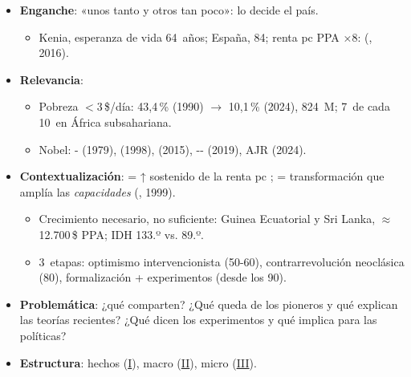 \documentclass{article}
\begin{document}
\cabecerarepaso
\begin{columnas}

\begin{itemize}
\item \textbf{Enganche}: «unos tanto y otros tan poco»: lo decide el país.
  \begin{itemize}
  \item Kenia, esperanza de vida 64~años; España, 84; renta pc PPA ×8:  (, 2016).
  \end{itemize}
\item \textbf{Relevancia}:
  \begin{itemize}
  \item Pobreza $<$3\,\$/día: 43,4\,\% (1990) $\to$ 10,1\,\% (2024), 824~M; 7~de cada 10~en África subsahariana.
  \item Nobel: - (1979),  (1998),  (2015), -- (2019), AJR (2024).
  \end{itemize}
\item \textbf{Contextualización}:  = ↑ sostenido de la renta pc ;  = transformación que amplía las \emph{capacidades} (, 1999).
  \begin{itemize}
  \item Crecimiento necesario, no suficiente: Guinea Ecuatorial y Sri Lanka, $\approx$12.700\,\$ PPA; IDH 133.º vs. 89.º.
  \item 3~etapas: optimismo intervencionista (50-60), contrarrevolución neoclásica (80), formalización + experimentos (desde los 90).
  \end{itemize}
\item \textbf{Problemática}: ¿qué comparten? ¿Qué queda de los pioneros y qué explican las teorías recientes? ¿Qué dicen los experimentos y qué implica para las políticas?
\item \textbf{Estructura}: hechos (\hyperref[rep:I]{I}), macro (\hyperref[rep:II]{II}), micro (\hyperref[rep:III]{III}).
\end{itemize}


\end{columnas}
\end{document}
